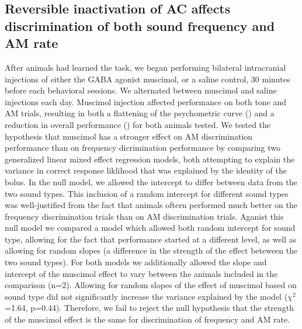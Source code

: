 \subsection{Reversible inactivation of AC affects discrimination of both sound
frequency and AM rate} After animals had learned the task, we began performing
bilateral intracranial injections of either the GABA agonist muscimol, or a
saline control, 30 minutes before each behavioral sessions.
%
We alternated between muscimol and saline injections each day. 
%
Muscimol injection affected performance on both tone and AM trials, resulting
in both a flattening of the psychometric curve (\fig{\amodPsychometrics}) and a
reduction in overall performance (\fig{\amodCorrect}) for both animals tested. 
%
We tested the hypothesis that muscimol has a stronger effect on AM
discrimination performance than on frequency dicrimination performance by
comparing two generalized linear mixed effect regression models, both attempting
to explain the variance in correct response liklihood that was explained by the
identity of the bolus. 
%
In the null model, we allowed the intercept to differ between data from the two
sound types.
%
This inclusion of a random intercept for different sound types was
well-justified from the fact that animals oftern performed much better on the
frequency discrimination trials than on AM discrimination trials.
%
Aganist this null model we compared a model which allowed both random
intercept for sound type, allowing for the fact that performance started
at a different level, as well as allowing for random slopes (a difference in
the strength of the effect beteween the two sound types).
%
For both models we additionally allowed the slope and intercept of the muscimol
effect to vary between the animals included in the comparison (n=2). 
%
Allowing for random slopes of the effect of muscimol based on sound type did
not significantly increase the variance explained by the model
($\chi^{2}$=1.64, p=0.44).
%
Therefore, we fail to reject the null hypothesis that the strength of the
muscimol effect is the same for discrimination of frequency and AM rate. 

